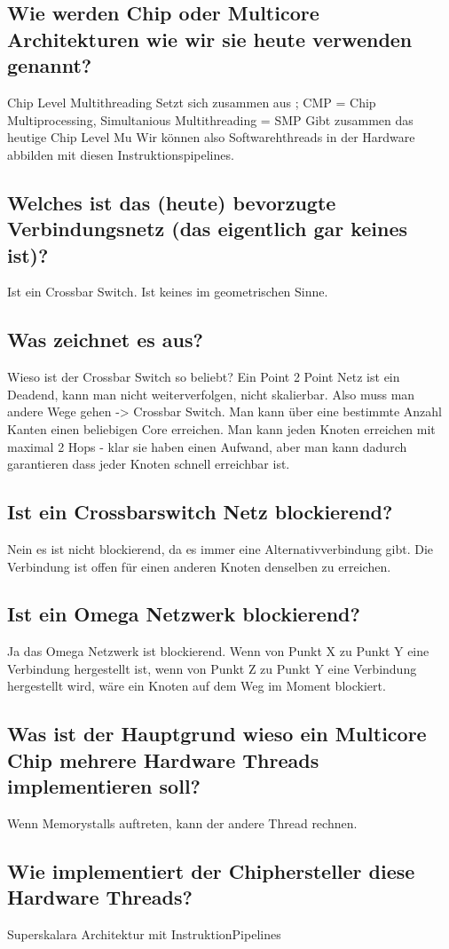 \subsection{Wie werden Chip oder Multicore Architekturen wie wir sie heute verwenden genannt?}
Chip Level Multithreading
Setzt sich zusammen aus ; CMP = Chip Multiprocessing, Simultanious Multithreading = SMP 
Gibt zusammen das heutige Chip Level Mu
Wir können also Softwarehthreads in der Hardware abbilden mit diesen Instruktionspipelines.
\subsection{Welches ist das (heute) bevorzugte Verbindungsnetz (das eigentlich gar keines ist)?}
Ist ein Crossbar Switch. Ist keines im geometrischen Sinne.
\subsection{Was zeichnet es aus?}
Wieso ist der Crossbar Switch so beliebt?
Ein Point 2 Point Netz ist ein Deadend, kann man nicht weiterverfolgen, nicht skalierbar. Also muss man andere Wege gehen -> Crossbar Switch.
Man kann über eine bestimmte Anzahl Kanten einen beliebigen Core erreichen.
Man kann jeden Knoten erreichen mit maximal 2 Hops - klar sie haben einen Aufwand, aber man kann dadurch garantieren dass jeder Knoten schnell erreichbar ist.
\subsection{Ist ein Crossbarswitch Netz blockierend?}
Nein es ist nicht blockierend, da es immer eine Alternativverbindung gibt. Die Verbindung ist offen für einen anderen Knoten denselben zu erreichen.
\subsection{Ist ein Omega Netzwerk blockierend?}
Ja das Omega Netzwerk ist blockierend. Wenn von Punkt X zu Punkt Y eine Verbindung hergestellt ist, wenn von Punkt Z zu Punkt Y eine Verbindung hergestellt wird, wäre ein Knoten auf dem Weg im Moment blockiert.
\subsection{Was ist der Hauptgrund wieso ein Multicore Chip mehrere Hardware Threads implementieren soll?}
Wenn Memorystalls auftreten, kann der andere Thread rechnen.
\subsection{Wie implementiert der Chiphersteller diese Hardware Threads?}
Superskalara Architektur mit InstruktionPipelines
